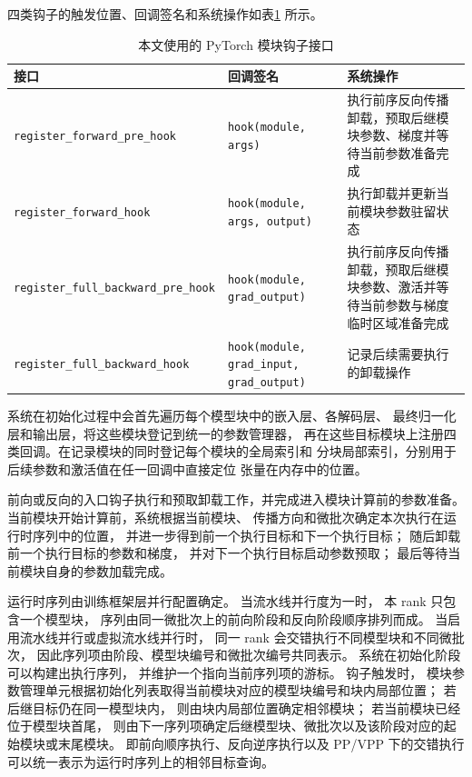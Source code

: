 \documentclass[bachelor,openany,oneside,color,AutoFakeBold=true]{buaathesis}
\begin{document}
四类钩子的触发位置、回调签名和系统操作如表\ref{tab:pytorch-hook-api} 所示。

\begin{table}[!htbp]
\centering
\caption{本文使用的 PyTorch 模块钩子接口}
\label{tab:pytorch-hook-api}
\begin{tabular}{p{}p{}p{}}
\toprule
接口 & 回调签名 & 系统操作 \\
\midrule
\texttt{register\_forward\_pre\_hook}
& \texttt{hook(module, args)}
& 执行前序反向传播卸载，预取后继模块参数、梯度并等待当前参数准备完成 \\
\texttt{register\_forward\_hook}
& \texttt{hook(module, args, output)}
& 执行卸载并更新当前模块参数驻留状态 \\
\texttt{register\_full\_backward\_pre\_hook}
& \texttt{hook(module, grad\_output)}
& 执行前序反向传播卸载，预取后继模块参数、激活并等待当前参数与梯度临时区域准备完成 \\
\texttt{register\_full\_backward\_hook}
& \texttt{hook(module, grad\_input, grad\_output)}
& 记录后续需要执行的卸载操作 \\
\bottomrule
\end{tabular}
\end{table}

系统在初始化过程中会首先遍历每个模型块中的嵌入层、各解码层、
最终归一化层和输出层，将这些模块登记到统一的参数管理器，
再在这些目标模块上注册四类回调。在记录模块的同时登记每个模块的全局索引和
分块局部索引，分别用于后续参数和激活值在任一回调中直接定位
张量在内存中的位置。

前向或反向的入口钩子执行和预取卸载工作，并完成进入模块计算前的参数准备。
当前模块开始计算前，系统根据当前模块、
传播方向和微批次确定本次执行在运行时序列中的位置，
并进一步得到前一个执行目标和下一个执行目标；
随后卸载前一个执行目标的参数和梯度，
并对下一个执行目标启动参数预取；
最后等待当前模块自身的参数加载完成。

运行时序列由训练框架层并行配置确定。
当流水线并行度为一时，
本 rank 只包含一个模型块，
序列由同一微批次上的前向阶段和反向阶段顺序排列而成。
当启用流水线并行或虚拟流水线并行时，
同一 rank 会交错执行不同模型块和不同微批次，
因此序列项由阶段、模型块编号和微批次编号共同表示。
系统在初始化阶段可以构建出执行序列，
并维护一个指向当前序列项的游标。
钩子触发时，
模块参数管理单元根据初始化列表取得当前模块对应的模型块编号和块内局部位置；
若后继目标仍在同一模型块内，
则由块内局部位置确定相邻模块；
若当前模块已经位于模型块首尾，
则由下一序列项确定后继模型块、微批次以及该阶段对应的起始模块或末尾模块。
即前向顺序执行、反向逆序执行以及 PP/VPP 下的交错执行
可以统一表示为运行时序列上的相邻目标查询。
\end{document}
